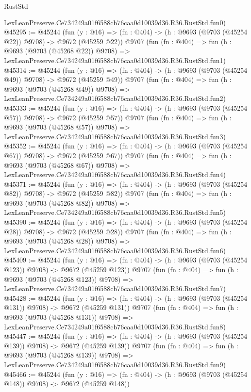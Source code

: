 \begin{lexlean}{RustStd}
\begin{coremodule}
    LexLeanPreserve.Ce734249a01f6588cb76caa0d10039d36.R36.RustStd.fun0)
@45295 := @45244
    (fun (y : @16) => (fn : @404) -> (h : @9693 (@9703 (@45254 @22)) @9708) -> @9672 (@45259 @22))
    @9707
    (fun (fn : @404) =>
    fun (h : @9693 (@9703 (@45268 @22)) @9708) =>
    LexLeanPreserve.Ce734249a01f6588cb76caa0d10039d36.R36.RustStd.fun1)
@45314 := @45244
    (fun (y : @16) => (fn : @404) -> (h : @9693 (@9703 (@45254 @49)) @9708) -> @9672 (@45259 @49))
    @9707
    (fun (fn : @404) =>
    fun (h : @9693 (@9703 (@45268 @49)) @9708) =>
    LexLeanPreserve.Ce734249a01f6588cb76caa0d10039d36.R36.RustStd.fun2)
@45333 := @45244
    (fun (y : @16) => (fn : @404) -> (h : @9693 (@9703 (@45254 @57)) @9708) -> @9672 (@45259 @57))
    @9707
    (fun (fn : @404) =>
    fun (h : @9693 (@9703 (@45268 @57)) @9708) =>
    LexLeanPreserve.Ce734249a01f6588cb76caa0d10039d36.R36.RustStd.fun3)
@45352 := @45244
    (fun (y : @16) => (fn : @404) -> (h : @9693 (@9703 (@45254 @67)) @9708) -> @9672 (@45259 @67))
    @9707
    (fun (fn : @404) =>
    fun (h : @9693 (@9703 (@45268 @67)) @9708) =>
    LexLeanPreserve.Ce734249a01f6588cb76caa0d10039d36.R36.RustStd.fun4)
@45371 := @45244
    (fun (y : @16) => (fn : @404) -> (h : @9693 (@9703 (@45254 @82)) @9708) -> @9672 (@45259 @82))
    @9707
    (fun (fn : @404) =>
    fun (h : @9693 (@9703 (@45268 @82)) @9708) =>
    LexLeanPreserve.Ce734249a01f6588cb76caa0d10039d36.R36.RustStd.fun5)
@45390 := @45244
    (fun (y : @16) => (fn : @404) -> (h : @9693 (@9703 (@45254 @28)) @9708) -> @9672 (@45259 @28))
    @9707
    (fun (fn : @404) =>
    fun (h : @9693 (@9703 (@45268 @28)) @9708) =>
    LexLeanPreserve.Ce734249a01f6588cb76caa0d10039d36.R36.RustStd.fun6)
@45409 := @45244
    (fun (y : @16) => (fn : @404) -> (h : @9693 (@9703 (@45254 @123)) @9708) -> @9672 (@45259 @123))
    @9707
    (fun (fn : @404) =>
    fun (h : @9693 (@9703 (@45268 @123)) @9708) =>
    LexLeanPreserve.Ce734249a01f6588cb76caa0d10039d36.R36.RustStd.fun7)
@45428 := @45244
    (fun (y : @16) => (fn : @404) -> (h : @9693 (@9703 (@45254 @131)) @9708) -> @9672 (@45259 @131))
    @9707
    (fun (fn : @404) =>
    fun (h : @9693 (@9703 (@45268 @131)) @9708) =>
    LexLeanPreserve.Ce734249a01f6588cb76caa0d10039d36.R36.RustStd.fun8)
@45447 := @45244
    (fun (y : @16) => (fn : @404) -> (h : @9693 (@9703 (@45254 @139)) @9708) -> @9672 (@45259 @139))
    @9707
    (fun (fn : @404) =>
    fun (h : @9693 (@9703 (@45268 @139)) @9708) =>
    LexLeanPreserve.Ce734249a01f6588cb76caa0d10039d36.R36.RustStd.fun9)
@45466 := @45244
    (fun (y : @16) => (fn : @404) -> (h : @9693 (@9703 (@45254 @148)) @9708) -> @9672 (@45259 @148))

\end{coremodule}
\end{lexlean}
